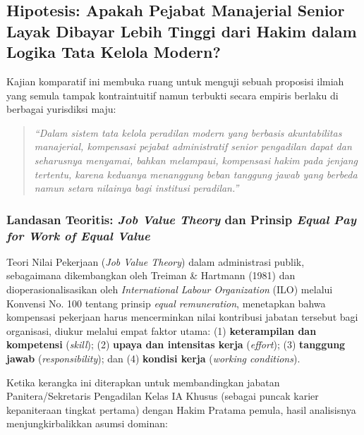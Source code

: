 \documentclass[12pt, a4paper]{article}
\begin{document}
\subsection{Hipotesis: Apakah Pejabat Manajerial Senior Layak Dibayar Lebih Tinggi dari Hakim dalam Logika Tata Kelola Modern?}

Kajian komparatif ini membuka ruang untuk menguji sebuah proposisi ilmiah yang semula tampak kontraintuitif namun terbukti secara empiris berlaku di berbagai yurisdiksi maju:

\begin{quote}
\textit{``Dalam sistem tata kelola peradilan modern yang berbasis akuntabilitas manajerial, kompensasi pejabat administratif senior pengadilan dapat dan seharusnya menyamai, bahkan melampaui, kompensasi hakim pada jenjang tertentu, karena keduanya menanggung beban tanggung jawab yang berbeda namun setara nilainya bagi institusi peradilan.''}
\end{quote}

\subsubsection{Landasan Teoritis: \textit{Job Value Theory} dan Prinsip \textit{Equal Pay for Work of Equal Value}}

Teori Nilai Pekerjaan (\textit{Job Value Theory}) dalam administrasi publik, sebagaimana dikembangkan oleh Treiman \& Hartmann (1981) dan dioperasionalisasikan oleh \textit{International Labour Organization} (ILO) melalui Konvensi No. 100 tentang prinsip \textit{equal remuneration}, menetapkan bahwa kompensasi pekerjaan harus mencerminkan nilai kontribusi jabatan tersebut bagi organisasi, diukur melalui empat faktor utama: (1) \textbf{keterampilan dan kompetensi} (\textit{skill}); (2) \textbf{upaya dan intensitas kerja} (\textit{effort}); (3) \textbf{tanggung jawab} (\textit{responsibility}); dan (4) \textbf{kondisi kerja} (\textit{working conditions}).

Ketika kerangka ini diterapkan untuk membandingkan jabatan Panitera/Sekretaris Pengadilan Kelas IA Khusus (sebagai puncak karier kepaniteraan tingkat pertama) dengan Hakim Pratama pemula, hasil analisisnya menjungkirbalikkan asumsi dominan:
\end{document}
